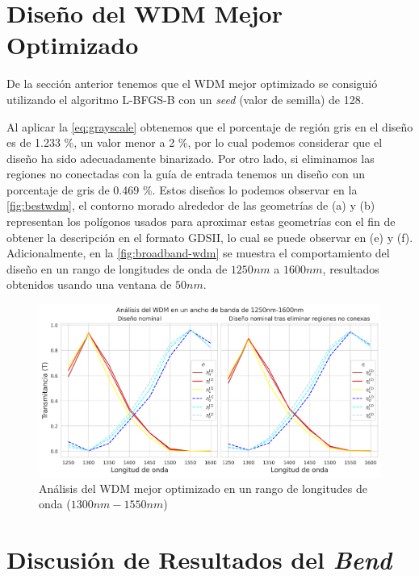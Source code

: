 \section{Diseño del WDM Mejor Optimizado}\label{sec:best-wdm}

De la sección anterior tenemos que el WDM mejor optimizado se consiguió
utilizando el algoritmo L-BFGS-B con un \emph{seed} (valor de semilla) de 128.

Al aplicar la \autoref{eq:grayscale} obtenemos que el porcentaje de región gris en el diseño
es de 1.233 \%, un valor menor a 2 \%, por lo cual podemos considerar que el diseño ha sido
adecuadamente binarizado. 
Por otro lado, si eliminamos las regiones no conectadas con la guía de entrada
tenemos un diseño con un porcentaje de gris de 0.469 \%.
Estos diseños lo podemos observar en la \autoref{fig:bestwdm},
el contorno morado alrededor de las geometrías de (a) y (b) representan los polígonos
usados para aproximar estas geometrías con el fin de obtener la descripción en el formato
GDSII, lo cual se puede observar en (e) y (f).
Adicionalmente, en la \autoref{fig:broadband-wdm} se muestra el comportamiento del diseño
en un rango de longitudes de onda de $1250nm$ a $1600 nm$, resultados obtenidos usando una ventana de $50nm$.

\begin{figure}[ht]
  \centering
  \includegraphics[width=\textwidth]{image/results/wdm/best/broadband-wdm.png}
  \caption{Análisis del WDM mejor optimizado en un rango de longitudes de onda ($1300 nm-1550 nm$)}
  \label{fig:broadband-wdm}
\end{figure}



\section{Discusión de Resultados del \emph{Bend}}

